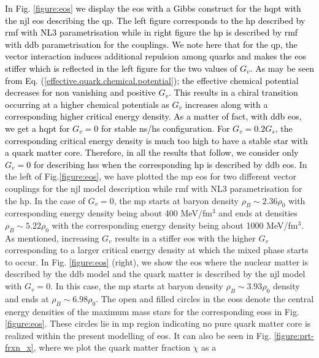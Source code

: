 \documentclass[a4paper, 11pt]{article}
\newcommand{\magenta}[1]{\textcolor{black}{#1}}
\begin{document}
\magenta{In Fig. \ref{figure:eos} we display the \ac{eos} with a Gibbs construct for the \ac{hqpt} with the 
\ac{njl} \ac{eos} describing the \ac{qp}. The left figure corresponds to the \ac{hp} described by \ac{rmf} 
with NL3 parametrisation while in right figure the \ac{hp} is described by \ac{rmf} with \ac{ddb} 
parametrisation for the couplings. We note here that for the \ac{qp}, the vector interaction induces
 additional repulsion among quarks and makes the \ac{eos} stiffer which is reflected in the left figure for 
the two values of $G_v$. As may be seen from Eq. (\ref{effective.quark.chemical.potential}); 
the effective chemical potential decreases for non vanishing and positive $G_v$. This results in a chiral transition 
occurring at a higher chemical potentials as $G_v$ increases along with a corresponding higher critical energy density.
 As a matter of fact, with \ac{ddb} \ac{eos}, we get a \ac{hqpt} for $G_v=0$ for 
stable \ac{ns}/\ac{hs} configuration. For $G_v=0.2 G_s$, the corresponding critical energy density is
much too high to have a stable star with a quark matter core. Therefore, in all the results that follow, we consider only $G_v=0$ for describing \ac{hs}s when the corresponding \ac{hp} is described by \ac{ddb} \ac{eos}.}
In the left of Fig.\ref{figure:eos}, we have plotted the \ac{mp} \ac{eos} for two different vector couplings for
the \ac{njl} model description while \ac{rmf} with NL3 parametrisation for the \ac{hp}. 
In the case of $G_v=0$, the \ac{mp} starts at baryon density $\rho_B \sim 2.36 \rho_0$ with corresponding
energy density being about 400 MeV/fm$^3$ and 
ends at densities $\rho_B \sim 5.22 \rho_0$ with the corresponding energy density being about 1000 MeV/fm$^3$.
As mentioned, increasing $G_v$ results in a  stiffer \ac{eos} with the higher $G_v$ corresponding  to a larger critical 
energy density at which the mixed phase starts to occur.
 In Fig. \ref{figure:eos} (right), we show the \ac{eos} where the nuclear matter is described by the \ac{ddb} model and 
the quark matter is described by the \ac{njl} model with $G_v=0$. 
In this case, the \ac{mp} starts at baryon density 
$\rho_B \sim 3.93 \rho_0$ density and ends at $\rho_B \sim 6.98 \rho_0$. The open and filled circles in the \ac{eos}s
 denote the central energy densities of the maximum mass stars for the corresponding \ac{eos}s in Fig. \ref{figure:eos}. 
These circles lie in \ac{mp} region indicating no pure quark matter core is realized within the present modelling of
\ac{eos}. It can also be seen in Fig. \ref{figure:prt-frxn_x}, where we plot the quark matter fraction $\chi$ as a 
\end{document}

